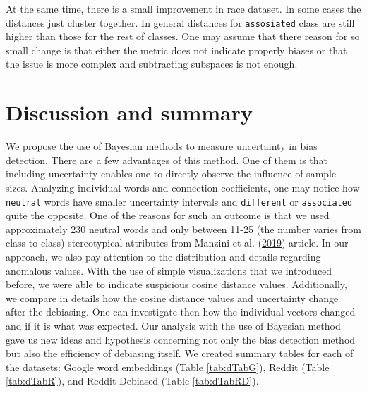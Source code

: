 \documentclass[12pt,]{book}
\begin{document}
At the same time, there is a small improvement in race dataset. In some
cases the distances just cluster together. In general distances for
\texttt{assosiated} class are still higher than those for the rest of
classes. One may assume that there reason for so small change is that
either the metric does not indicate properly biases or that the issue is
more complex and subtracting subspaces is not enough.

\chapter{Discussion and summary}\label{discussion-and-summary}

We propose the use of Bayesian methods to measure uncertainty in bias
detection. There are a few advantages of this method. One of them is
that including uncertainty enables one to directly observe the influence
of sample sizes. Analyzing individual words and connection coefficients,
one may notice how \texttt{neutral} words have smaller uncertainty
intervals and \texttt{different} or \texttt{associated} quite the
opposite. One of the reasons for such an outcome is that we used
approximately 230 neutral words and only between 11-25 (the number
varies from class to class) stereotypical attributes from Manzini et al.
(\protect\hyperlink{ref-Manzini2019blackToCriminal}{2019}) article. In
our approach, we also pay attention to the distribution and details
regarding anomalous values. With the use of simple visualizations that
we introduced before, we were able to indicate suspicious cosine
distance values. Additionally, we compare in details how the cosine
distance values and uncertainty change after the debiasing. One can
investigate then how the individual vectors changed and if it is what
was expected. Our analysis with the use of Bayesian method gave us new
ideas and hypothesis concerning not only the bias detection method but
also the efficiency of debiasing itself. We created summary tables for
each of the datasets: Google word embeddings (Table \ref{tab:dTabG}),
Reddit (Table \ref{tab:dTabR}), and Reddit Debiased (Table
\ref{tab:dTabRD}).

\vspace{1mm} \footnotesize
\end{document}

